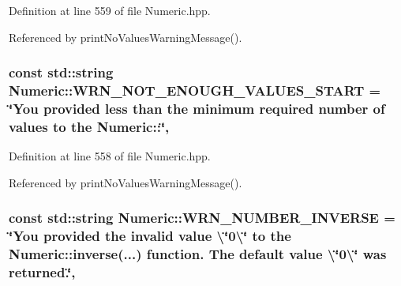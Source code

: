 Definition at line 559 of file Numeric.\-hpp.



Referenced by print\-No\-Values\-Warning\-Message().

\hypertarget{classmultiscale_1_1Numeric_ab78e644d069f448030e24fecb7c4c8d9}{
\subsubsection[{W\-R\-N\-\_\-\-N\-O\-T\-\_\-\-E\-N\-O\-U\-G\-H\-\_\-\-V\-A\-L\-U\-E\-S\-\_\-\-S\-T\-A\-R\-T}]{\setlength{\rightskip}{0pt plus 5cm}const std\-::string Numeric\-::\-W\-R\-N\-\_\-\-N\-O\-T\-\_\-\-E\-N\-O\-U\-G\-H\-\_\-\-V\-A\-L\-U\-E\-S\-\_\-\-S\-T\-A\-R\-T = \char`\"{}You provided less than the {\bf minimum} required number of values to the Numeric\-::\char`\"{}\hspace{0.3cm}{\ttfamily [static]}, {\ttfamily [private]}}}\label{classmultiscale_1_1Numeric_ab78e644d069f448030e24fecb7c4c8d9}


Definition at line 558 of file Numeric.\-hpp.



Referenced by print\-No\-Values\-Warning\-Message().

\hypertarget{classmultiscale_1_1Numeric_ac1e4755ec54d2c04217d0d1f4b5d346b}{
\subsubsection[{W\-R\-N\-\_\-\-N\-U\-M\-B\-E\-R\-\_\-\-I\-N\-V\-E\-R\-S\-E}]{\setlength{\rightskip}{0pt plus 5cm}const std\-::string Numeric\-::\-W\-R\-N\-\_\-\-N\-U\-M\-B\-E\-R\-\_\-\-I\-N\-V\-E\-R\-S\-E = \char`\"{}You provided the invalid value \textbackslash{}\char`\"{}0\textbackslash{}\char`\"{} to the Numeric\-::inverse(...) function. The default value \textbackslash{}\char`\"{}0\textbackslash{}\char`\"{} was returned.\char`\"{}\hspace{0.3cm}{\ttfamily [static]}, {\ttfamily [private]}}}\label{classmultiscale_1_1Numeric_ac1e4755ec54d2c04217d0d1f4b5d346b}


